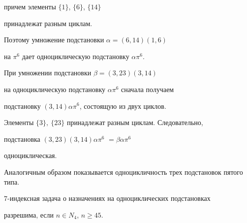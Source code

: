 \begin{pf}
причем элементы $\{1\}$, $\{6\}$, $\{14\}$


принадлежат разным циклам.


Поэтому умножение подстановки $\alpha = (6,14)(1,6)$


на $\pi^6$ дает  одноциклическую подстановку $\alpha \pi^6$.


При умножении подстановки $\beta=(3,23)(3,14)$


на одноциклическую подстановку $\alpha \pi^6$ сначала получаем


подстановку $(3,14) \alpha \pi^6$, состоящую из двух циклов.


Элементы $\{3\},\ \{23\}$ принадлежат разным циклам. Следовательно,


подстановка $(3,23)(3,14) \alpha \pi^6$ $=\beta \alpha \pi^6$


одноциклическая.





Аналогичным образом показывается одноцикличность трех подстановок пятого типа.


\end{pf}





\begin{lem}


\label{lm4}


$7$-индексная задача о назначениях на одноциклических подстановках


разрешима, если $n\in N_4$, $n\ge 45$.


\end{lem}





